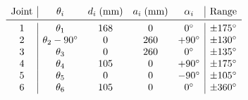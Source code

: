 \documentclass[border=10pt]{standalone}
\begin{document}
\[
\begin{array}{c|cccc|c}
\text{Joint} & \theta_i & d_i\;(\text{mm}) & a_i\;(\text{mm}) & \alpha_i & \text{Range} \\ \midrule
1 & \theta_1 & 168 & 0 & 0^\circ & \pm175^\circ \\
2 & \theta_2-90^\circ & 0 & 260 & +90^\circ & \pm130^\circ \\
3 & \theta_3 & 0 & 260 & 0^\circ & \pm135^\circ \\
4 & \theta_4 & 105 & 0 & +90^\circ & \pm175^\circ \\
5 & \theta_5 & 0 & 0 & -90^\circ & \pm105^\circ \\
6 & \theta_6 & 105 & 0 & 0^\circ & \pm360^\circ
\end{array}
\]
\end{document}

